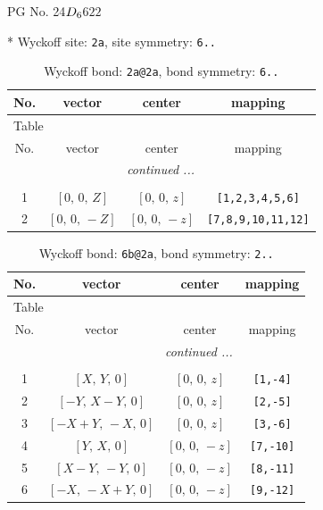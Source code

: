 \documentclass[fleqn,8pt]{jsarticle}
\begin{document}
\setcounter{MaxMatrixCols}{32}

\renewcommand{\tablename}{Table~}
\renewcommand{\figurename}{Figure~}
\begin{center}
\LARGE
PG No. 24\quad$D_{\rm 6}$\quad$622$\quad[ hexagonal ]
\end{center}


* Wyckoff site: {\tt 2a}, site symmetry: {\tt 6..}
\renewcommand{\arraystretch}{1.2}
\begin{longtable}{cccc}
\caption{Wyckoff bond: {\tt 2a@2a}, bond symmetry: {\tt 6..}}
 \\
 \hline \hline
No. & vector & center & mapping \\ \hline \endfirsthead

\multicolumn{3}{l}{\tablename\ \thetable{}} \\
 \hline \hline
No. & vector & center & mapping \\ \hline \endhead

 \hline \hline
\multicolumn{3}{r}{\footnotesize\it continued ...} \\ \endfoot

 \hline \hline
\multicolumn{3}{r}{} \\ \endlastfoot

1 & $\left[ 0,\, 0,\, Z \right]$ & $\left[ 0,\, 0,\, z \right]$ & {\tt [1,2,3,4,5,6]} \\ \hline
2 & $\left[ 0,\, 0,\, - Z \right]$ & $\left[ 0,\, 0,\, - z \right]$ & {\tt [7,8,9,10,11,12]} \\
\end{longtable}
\renewcommand{\arraystretch}{1.2}
\begin{longtable}{cccc}
\caption{Wyckoff bond: {\tt 6b@2a}, bond symmetry: {\tt 2..}}
 \\
 \hline \hline
No. & vector & center & mapping \\ \hline \endfirsthead

\multicolumn{3}{l}{\tablename\ \thetable{}} \\
 \hline \hline
No. & vector & center & mapping \\ \hline \endhead

 \hline \hline
\multicolumn{3}{r}{\footnotesize\it continued ...} \\ \endfoot

 \hline \hline
\multicolumn{3}{r}{} \\ \endlastfoot

1 & $\left[ X,\, Y,\, 0 \right]$ & $\left[ 0,\, 0,\, z \right]$ & {\tt [1,-4]} \\ \hline
2 & $\left[ - Y,\, X - Y,\, 0 \right]$ & $\left[ 0,\, 0,\, z \right]$ & {\tt [2,-5]} \\ \hline
3 & $\left[ - X + Y,\, - X,\, 0 \right]$ & $\left[ 0,\, 0,\, z \right]$ & {\tt [3,-6]} \\ \hline
4 & $\left[ Y,\, X,\, 0 \right]$ & $\left[ 0,\, 0,\, - z \right]$ & {\tt [7,-10]} \\ \hline
5 & $\left[ X - Y,\, - Y,\, 0 \right]$ & $\left[ 0,\, 0,\, - z \right]$ & {\tt [8,-11]} \\ \hline
6 & $\left[ - X,\, - X + Y,\, 0 \right]$ & $\left[ 0,\, 0,\, - z \right]$ & {\tt [9,-12]} \\
\end{longtable}
\end{document}
